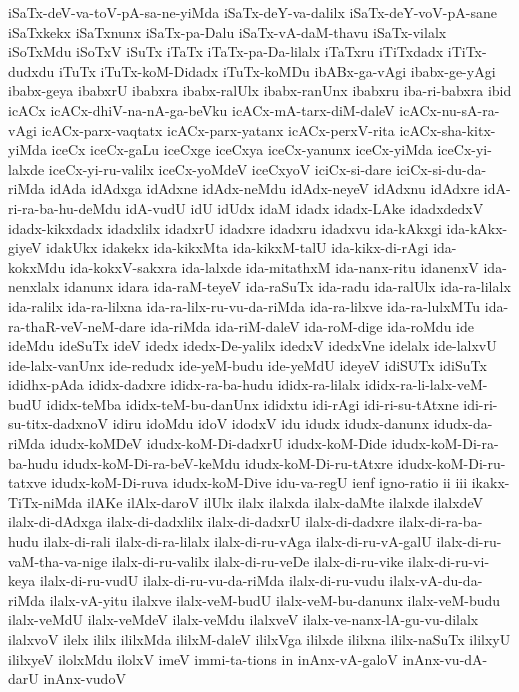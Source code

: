 {iSaTx-deV-va-toV-pA-sa-ne-yiMda
iSaTx-deY-va-dalilx
iSaTx-deY-voV-pA-sane
iSaTxkekx
iSaTxnunx
iSaTx-pa-Dalu
iSaTx-vA-daM-thavu
iSaTx-vilalx
iSoTxMdu
iSoTxV
iSuTx
iTaTx
iTaTx-pa-Da-lilalx
iTaTxru
iTiTxdadx
iTiTx-dudxdu
iTuTx
iTuTx-koM-Didadx
iTuTx-koMDu
ibABx-ga-vAgi
ibabx-ge-yAgi
ibabx-geya
ibabxrU
ibabxra
ibabx-ralUlx
ibabx-ranUnx
ibabxru
iba-ri-babxra
ibid
icACx
icACx-dhiV-na-nA-ga-beVku
icACx-mA-tarx-diM-daleV
icACx-nu-sA-ra-vAgi
icACx-parx-vaqtatx
icACx-parx-yatanx
icACx-perxV-rita
icACx-sha-kitx-yiMda
iceCx
iceCx-gaLu
iceCxge
iceCxya
iceCx-yanunx
iceCx-yiMda
iceCx-yi-lalxde
iceCx-yi-ru-valilx
iceCx-yoMdeV
iceCxyoV
iciCx-si-dare
iciCx-si-du-da-riMda
idAda
idAdxga
idAdxne
idAdx-neMdu
idAdx-neyeV
idAdxnu
idAdxre
idA-ri-ra-ba-hu-deMdu
idA-vudU
idU
idUdx
idaM
idadx
idadx-LAke
idadxdedxV
idadx-kikxdadx
idadxlilx
idadxrU
idadxre
idadxru
idadxvu
ida-kAkxgi
ida-kAkx-giyeV
idakUkx
idakekx
ida-kikxMta
ida-kikxM-talU
ida-kikx-di-rAgi
ida-kokxMdu
ida-kokxV-sakxra
ida-lalxde
ida-mitathxM
ida-nanx-ritu
idanenxV
ida-nenxlalx
idanunx
idara
ida-raM-teyeV
ida-raSuTx
ida-radu
ida-ralUlx
ida-ra-lilalx
ida-ralilx
ida-ra-lilxna
ida-ra-lilx-ru-vu-da-riMda
ida-ra-lilxve
ida-ra-lulxMTu
ida-ra-thaR-veV-neM-dare
ida-riMda
ida-riM-daleV
ida-roM-dige
ida-roMdu
ide
ideMdu
ideSuTx
ideV
idedx
idedx-De-yalilx
idedxV
idedxVne
idelalx
ide-lalxvU
ide-lalx-vanUnx
ide-redudx
ide-yeM-budu
ide-yeMdU
ideyeV
idiSUTx
idiSuTx
ididhx-pAda
ididx-dadxre
ididx-ra-ba-hudu
ididx-ra-lilalx
ididx-ra-li-lalx-veM-budU
ididx-teMba
ididx-teM-bu-danUnx
ididxtu
idi-rAgi
idi-ri-su-tAtxne
idi-ri-su-titx-dadxnoV
idiru
idoMdu
idoV
idodxV
idu
idudx
idudx-danunx
idudx-da-riMda
idudx-koMDeV
idudx-koM-Di-dadxrU
idudx-koM-Dide
idudx-koM-Di-ra-ba-hudu
idudx-koM-Di-ra-beV-keMdu
idudx-koM-Di-ru-tAtxre
idudx-koM-Di-ru-tatxve
idudx-koM-Di-ruva
idudx-koM-Dive
idu-va-regU
ienf
igno-ratio
ii
iii
ikakx-TiTx-niMda
ilAKe
ilAlx-daroV
ilUlx
ilalx
ilalxda
ilalx-daMte
ilalxde
ilalxdeV
ilalx-di-dAdxga
ilalx-di-dadxlilx
ilalx-di-dadxrU
ilalx-di-dadxre
ilalx-di-ra-ba-hudu
ilalx-di-rali
ilalx-di-ra-lilalx
ilalx-di-ru-vAga
ilalx-di-ru-vA-galU
ilalx-di-ru-vaM-tha-va-nige
ilalx-di-ru-valilx
ilalx-di-ru-veDe
ilalx-di-ru-vike
ilalx-di-ru-vi-keya
ilalx-di-ru-vudU
ilalx-di-ru-vu-da-riMda
ilalx-di-ru-vudu
ilalx-vA-du-da-riMda
ilalx-vA-yitu
ilalxve
ilalx-veM-budU
ilalx-veM-bu-danunx
ilalx-veM-budu
ilalx-veMdU
ilalx-veMdeV
ilalx-veMdu
ilalxveV
ilalx-ve-nanx-lA-gu-vu-dilalx
ilalxvoV
ilelx
ililx
ililxMda
ililxM-daleV
ililxVga
ililxde
ililxna
ililx-naSuTx
ililxyU
ililxyeV
ilolxMdu
ilolxV
imeV
immi-ta-tions
in
inAnx-vA-galoV
inAnx-vu-dA-darU
inAnx-vudoV
}
